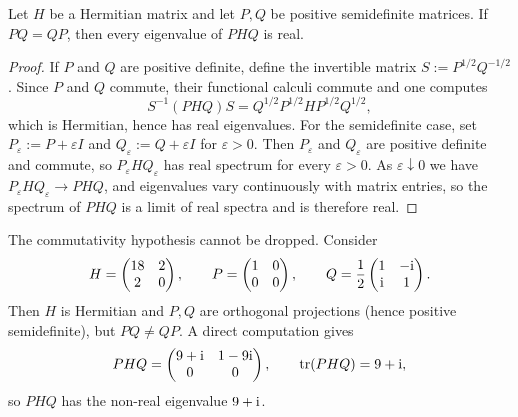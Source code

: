 \begin{proposition}
\label{prop:commuting_cuts_real_spectra}
Let $H$ be a Hermitian matrix and let $P,Q$ be positive semidefinite matrices. If $PQ=QP$, then every eigenvalue of $PHQ$ is real.
\end{proposition}

\begin{proof}
If $P$ and $Q$ are positive definite, define the invertible matrix $S:=P^{1/2}Q^{-1/2}$. Since $P$ and $Q$ commute, their functional calculi commute and one computes
$$
S^{-1}(PHQ)S
=Q^{1/2}P^{1/2}HP^{1/2}Q^{1/2},
$$
which is Hermitian, hence has real eigenvalues. For the semidefinite case, set $P_\varepsilon:=P+\varepsilon I$ and $Q_\varepsilon:=Q+\varepsilon I$ for $\varepsilon>0$. Then $P_\varepsilon$ and $Q_\varepsilon$ are positive definite and commute, so $P_\varepsilon H Q_\varepsilon$ has real spectrum for every $\varepsilon>0$. As $\varepsilon\downarrow 0$ we have $P_\varepsilon H Q_\varepsilon\to PHQ$, and eigenvalues vary continuously with matrix entries, so the spectrum of $PHQ$ is a limit of real spectra and is therefore real.
\end{proof}

\begin{remark}
\label{rem:noncommuting_cuts_imaginary}
The commutativity hypothesis cannot be dropped. Consider
$$
H=\begin{pmatrix}18&2\\2&0\end{pmatrix},\qquad
P=\begin{pmatrix}1&0\\0&0\end{pmatrix},\qquad
Q=\frac12\begin{pmatrix}1&-\mathrm{i}\\\mathrm{i}&1\end{pmatrix}.
$$
Then $H$ is Hermitian and $P,Q$ are orthogonal projections (hence positive semidefinite), but $PQ\ne QP$. A direct computation gives
$$
PHQ=\begin{pmatrix}9+\mathrm{i}&1-9\mathrm{i}\\0&0\end{pmatrix},
\qquad
\operatorname{tr}(PHQ)=9+\mathrm{i},
$$
so $PHQ$ has the non-real eigenvalue $9+\mathrm{i}$.
\end{remark}
